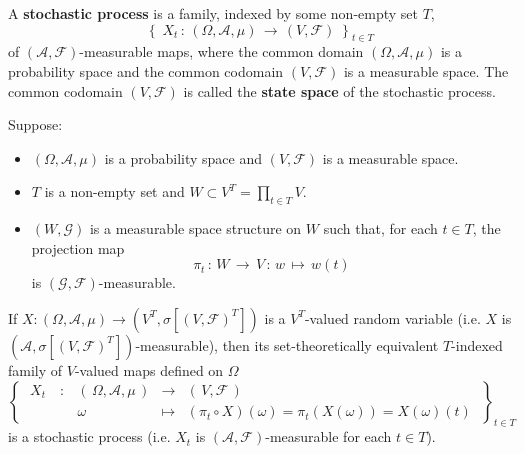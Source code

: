 \begin{definition}
\mbox{}\vskip 0.1cm
\noindent
A \textbf{stochastic process} is a family, indexed by some non-empty set $T$,
\begin{equation*}
\left\{\;
X_{t} \,:\, \left(\Omega,\mathcal{A},\mu\right)
\,\longrightarrow\,
\left(V,\mathcal{F}\right)
\;\right\}_{t \in T}
\end{equation*}
of $\left(\mathcal{A},\mathcal{F}\right)$-measurable maps,
where the common domain $\left(\Omega,\mathcal{A},\mu\right)$ is a probability space
and the common codomain $\left(V,\mathcal{F}\right)$ is a measurable space.
The common codomain $\left(V,\mathcal{F}\right)$ is called the \textbf{state space}
of the stochastic process.
\end{definition}

\begin{corollary}
\mbox{}\vskip 0.1cm
\noindent
Suppose:
\begin{itemize}
\item	$\left(\Omega,\mathcal{A},\mu\right)$ is a probability space and
		$\left(V,\mathcal{F}\right)$ is a measurable space.
\item	$T$ is a non-empty set and $W \subset V^{T} = \prod_{t \in T}V$.
\item	$\left(W,\mathcal{G}\right)$ is a measurable space structure on $W$
		such that, for each $t \in T$, the projection map
		\begin{equation*}
			\pi_{t} \,:\, W \,\longrightarrow\, V \,:\, w \,\longmapsto\, w(t)
		\end{equation*}
		is $\left(\mathcal{G},\mathcal{F}\right)$-measurable.
\end{itemize}
If $X:\left(\Omega,\mathcal{A},\mu\right)\longrightarrow\left(V^{T},\sigma[(V,\mathcal{F})^{T}]\right)$
is a $V^{T}$-valued random variable
(i.e. $X$ is $\left(\mathcal{A},\sigma[(V,\mathcal{F})^{T}]\right)$-measurable),
then its set-theoretically equivalent $T$-indexed family of $V$-valued maps defined on $\Omega$
\begin{equation*}
	\left\{\;
	\begin{array}{cccl}
	X_{t}\quad :
	& \left(\,\Omega,\mathcal{A},\mu\,\right) & \longrightarrow & \left(\,V,\mathcal{F}\,\right) \\
	& \omega & \longmapsto & (\pi_{t} \circ X)(\omega) = \pi_{t}(X(\omega)) = X(\omega)(t)
	\end{array}
	\;\right\}_{t \in T}
\end{equation*}
is a stochastic process (i.e. $X_{t}$ is $(\mathcal{A},\mathcal{F})$-measurable for each $t\in T$).
\end{corollary}

